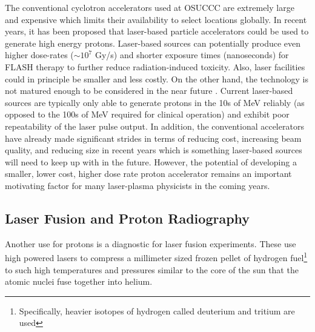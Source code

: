The conventional cyclotron accelerators used at \gls{OSUCCC} are extremely large and expensive which limits their availability to select locations globally. In recent years, it has been proposed that laser-based particle accelerators could be used to generate high energy protons. Laser-based sources can potentially produce even higher dose-rates ($\sim10^7$ Gy/s) and shorter exposure times (nanoseconds) for FLASH therapy \cite{Bin_2022_SciRep} to further reduce radiation-induced toxicity. Also, laser facilities could in principle be smaller and less costly. On the other hand, the technology is not matured enough to be considered in the near future \cite{Linz_2016_LaPB}. Current laser-based sources are typically only able to generate protons in the 10s of MeV reliably (as opposed to the 100s of MeV required for clinical operation) and exhibit poor repeatability of the laser pulse output. In addition, the conventional accelerators have already made significant strides in terms of reducing cost, increasing beam quality, and reducing size in recent years \cite{Linz_2016_LaPB} which is something laser-based sources will need to keep up with in the future. However, the potential of developing a smaller, lower cost, higher dose rate proton accelerator remains an important motivating factor for many laser-plasma physicists in the coming years.

\subsection{Laser Fusion and Proton Radiography}

Another use for protons is a diagnostic for laser fusion experiments. These use high powered lasers to compress a millimeter sized frozen pellet of hydrogen fuel\footnote{Specifically, heavier isotopes of hydrogen called deuterium and tritium are used} to such high temperatures and pressures similar to the core of the sun that the atomic nuclei fuse together into helium.

